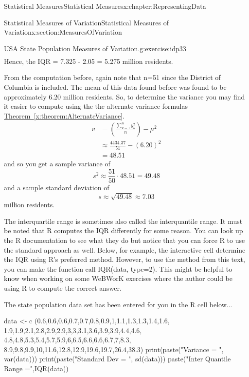 \documentclass[oneside,10pt,]{book}
\newcommand{\xreffont}{\relax}
\numberwithin{equation}{section}
\begin{document}
\begin{chapterptx}{Statistical Measures}{}{Statistical Measures}{}{}{x:chapter:RepresentingData}
\begin{sectionptx}{Statistical Measures of Variation}{}{Statistical Measures of Variation}{}{}{x:section:MeasuresOfVariation}
\begin{inlineexercise}{USA State Population Measures of Variation.}{g:exercise:idp33}
\begin{gather*}
\end{gather*}
Hence, the IQR = 7.325 - 2.05 = 5.275 million residents.%
\par
From the computation before, again note that n=51 since the District of Columbia is included. The mean of this data found before was found to be approximately 6.20 million residents. So, to determine the variance you may find it easier to compute using the the alternate variance formulas \hyperref[x:theorem:AlternateVariance]{Theorem~{\xreffont\ref{x:theorem:AlternateVariance}}}.%
\begin{align*}
v & = \left ( \frac{\sum_{k=1}^n y_k^2 }{n} \right ) - \mu^2\\
& \approx \frac{4434.37}{51} - (6.20)^2\\
& = 48.51
\end{align*}
and so you get a sample variance of%
\begin{equation*}
s^2 \approx \frac{51}{50} \cdot 48.51 = 49.48
\end{equation*}
and a sample standard deviation of%
\begin{equation*}
s \approx \sqrt{49.48} \approx 7.03
\end{equation*}
million residents.%
\end{inlineexercise}%
The interquartile range is sometimes also called the interquantile range. It must be noted that R computes the IQR differently for some reason. You can look up the R documentation to see what they do but notice that you can force R to use the standard approach as well.  Below, for example, the interactive cell determine the IQR using R's preferred method. However, to use the method from this text, you can make the function call IQR(data, type=2). This might be helpful to know when working on some WeBWorK exercises where the author could be using R to compute the correct answer.%
\par
The state population data set has been entered for you in the R cell below... \leavevmode%
\begin{sageinput}
data <- c (0.6,0.6,0.6,0.7,0.7,0.8,0.9,1,1.1,1.3,1.3,1.4,1.6,
1.9,1.9,2.1,2.8,2.9,2.9,3,3,3.1,3.6,3.9,3.9,4.4,4.6,
4.8,4.8,5.3,5.4,5.7,5.9,6,6.5,6.6,6.6,6.7,7,8.3,
8.9,9.8,9.9,10,11.6,12.8,12.9,19.6,19.7,26.4,38.3)
print(paste("Variance = ", var(data)))
print(paste("Standard Dev = ", sd(data)))
paste("Inter Quantile Range =",IQR(data))
\end{sageinput}
%
\end{sectionptx}
%
%
\typeout{************************************************}

\end{chapterptx}
\end{document}
